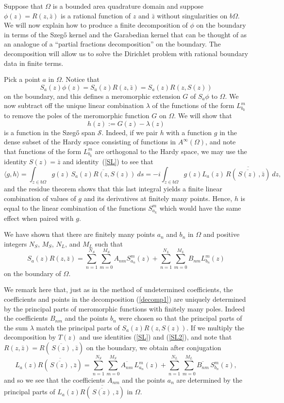 \documentclass[12pt]{amsart}
\newcommand\Om{\Omega}
\numberwithin{equation}{section}
\begin{document}
Suppose that $\Om$ is a bounded area
quadrature domain and suppose $\phi(z)=R(z,\bar z)$ is a
rational function of $z$ and $\bar z$ without singularities
on $b\Om$. We will now explain how to produce a finite
decomposition of $\phi$ on the boundary in terms of the
Szeg\H o kernel and the Garabedian kernel that can be
thought of as an analogue of a ``partial fractions
decomposition'' on the boundary.  The decomposition will
allow us to solve the Dirichlet problem with rational
boundary data in finite terms.

Pick a point $a$ in $\Om$.  Notice that
$$S_a(z)\phi(z)=S_a(z)R(z,\bar z)= S_a(z)R(z,S(z))$$
on the boundary, and this defines a meromorphic extension
$G$ of $S_a\phi$ to $\Om$. We now subtract off the unique
linear combination $\lambda$ of the functions of the form
$L^m_{b_k}$ to remove the poles of the meromorphic function
$G$ on $\Om$.  We will show that
$$h(z):=G(z) -\lambda(z)$$
is a function in the Szeg\H o span $\mathcal S$.
Indeed, if we pair $h$ with a function $g$ in the
dense subset of the Hardy space consisting of functions
in $A^\infty(\Om)$, and note that functions of the
form $L^m_{b_k}$ are orthogonal to the Hardy space,
we may use the identity $S(z)=\bar z$ and identity~(\ref{SL})
to see that
$$\langle g, h\rangle = \int_{z\in b\Om}
g(z)\,\overline{S_a(z)R(z,S(z))}\ ds
=-i\int_{z\in b\Om} g(z) L_a(z)\,\overline{R(\,\overline{S(z)}\,,\bar z)}
\ dz,$$
and the residue theorem shows that this last integral yields
a finite linear combination of values of $g$ and its
derivatives at finitely many points.  Hence, $h$ is
equal to the linear combination of the functions
$S^m_{a_k}$ which would have the same effect when paired
with $g$.

We have shown that there are finitely many points
$a_n$ and $b_n$ in $\Om$ and positive integers
$N_S$, $M_S$, $N_L$, and $M_L$ such that
\begin{equation}
\label{decomp1}
S_a(z)R(z,\bar z) =
\sum_{n=1}^{N_S}\sum_{m=0}^{M_S} A_{nm} S_{a_n}^m(z)
+\sum_{n=1}^{N_L}\sum_{m=0}^{M_L} B_{nm} L_{b_n}^m(z)
\end{equation}
on the boundary of $\Om$.

We remark here that, just as in the method of
undetermined coefficients, the coefficients and
points in the decomposition (\ref{decomp1}) are
uniquely determined by the principal parts of
meromorphic functions with finitely many poles.
Indeed the coefficients $B_{nm}$ and the points
$b_n$ were chosen so that the principal parts of
the sum $\lambda$ match the principal parts
of $S_a(z)R(z,S(z))$.  If we multiply the decomposition
by $T(z)$ and use identities (\ref{SL}) and (\ref{SL2}),
and note that $R(z,\bar z)=R(\,\overline{S(z)}\,,\bar z)$
on the boundary, we obtain after conjugation
\begin{equation}
\label{decomp2}
L_a(z)\overline{R(\,\overline{S(z)}\,,\bar z)} =
\sum_{n=1}^{N_S}\sum_{m=0}^{M_S} \overline{A_{nm}}\,L_{a_n}^m(z)
+\sum_{n=1}^{N_L}\sum_{m=0}^{M_L} \overline{B_{nm}}\,S_{b_n}^m(z),
\end{equation}
and so we see that the coefficients $A_{nm}$ and
the points $a_n$ are determined by the principal parts of
$L_a(z)\overline{R(\,\overline{S(z)}\,,\bar z)}$ in $\Om$.
\end{document}

